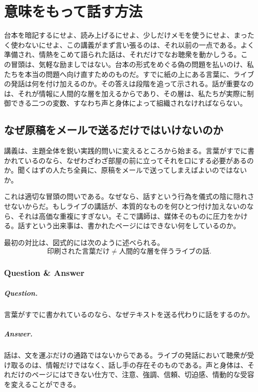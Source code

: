 \chapter{意味をもって話す方法}

台本を暗記するにせよ、読み上げるにせよ、少しだけメモを使うにせよ、まったく使わないにせよ、この講義がまず言い張るのは、それ以前の一点である。よく準備され、情熱をこめて語られた話は、それだけでなお聴衆を動かしうる。この冒頭は、気軽な励ましではない。台本の形式をめぐる偽の問題を払いのけ、私たちを本当の問題へ向け直すためのものだ。すでに紙の上にある言葉に、ライブの発話は何を付け加えるのか。その答えは段階を追って示される。話が重要なのは、それが情報に人間的な層を加えるからであり、その層は、私たちが実際に制御できる二つの変数、すなわち声と身体によって組織されなければならない。

\section{なぜ原稿をメールで送るだけではいけないのか}

講義は、主題全体を鋭い実践的問いに変えるところから始まる。言葉がすでに書かれているのなら、なぜわざわざ部屋の前に立ってそれを口にする必要があるのか。聞くはずの人たち全員に、原稿をメールで送ってしまえばよいのではないか。

これは適切な冒頭の問いである。なぜなら、話すという行為を儀式の陰に隠れさせないからだ。もしライブの講話が、本質的なものを何ひとつ付け加えないのなら、それは高価な重複にすぎない。そこで講師は、媒体そのものに圧力をかける。話すという出来事は、書かれたページにはできない何をしているのか。

最初の対比は、図式的には次のように述べられる。
\begin{equation}
\text{印刷された言葉だけ} \neq \text{人間的な層を伴うライブの話}.
\end{equation}

\subsection{Question \& Answer}

\paragraph{Question.} 言葉がすでに書かれているのなら、なぜテキストを送る代わりに話をするのか。

\paragraph{Answer.} 話は、文を運ぶだけの通路ではないからである。ライブの発話において聴衆が受け取るのは、情報だけではなく、話し手の存在そのものである。声と身体は、それだけのページにはできない仕方で、注意、強調、信頼、切迫感、情動的な受容を変えることができる。

